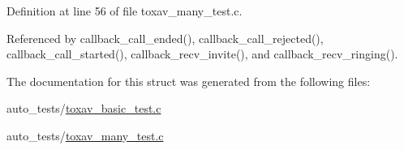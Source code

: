 Definition at line 56 of file toxav\+\_\+many\+\_\+test.\+c.



Referenced by callback\+\_\+call\+\_\+ended(), callback\+\_\+call\+\_\+rejected(), callback\+\_\+call\+\_\+started(), callback\+\_\+recv\+\_\+invite(), and callback\+\_\+recv\+\_\+ringing().



The documentation for this struct was generated from the following files\+:\begin{DoxyCompactItemize}
\item 
auto\+\_\+tests/\hyperlink{toxav__basic__test_8c}{toxav\+\_\+basic\+\_\+test.\+c}\item 
auto\+\_\+tests/\hyperlink{toxav__many__test_8c}{toxav\+\_\+many\+\_\+test.\+c}\end{DoxyCompactItemize}
